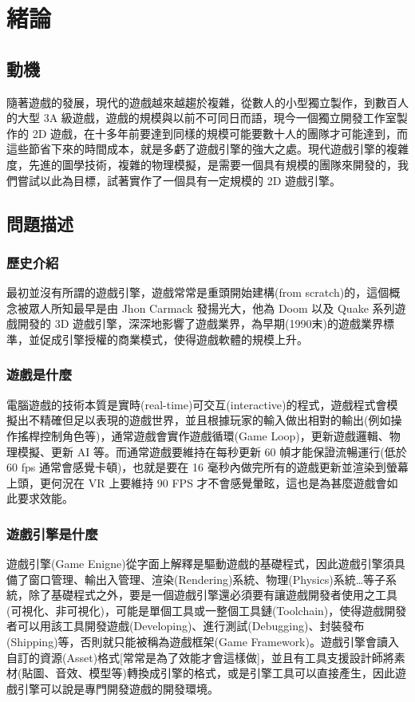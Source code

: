 \chapter{緒論}

\section{動機}

隨著遊戲的發展，現代的遊戲越來越趨於複雜，從數人的小型獨立製作，到數百人的大型 3A 級遊戲，遊戲的規模與以前不可同日而語，現今一個獨立開發工作室製作的 2D 遊戲，在十多年前要達到同樣的規模可能要數十人的團隊才可能達到，而這些節省下來的時間成本，就是多虧了遊戲引擎的強大之處。現代遊戲引擎的複雜度，先進的圖學技術，複雜的物理模擬，是需要一個具有規模的團隊來開發的，我們嘗試以此為目標，試著實作了一個具有一定規模的 2D 遊戲引擎。

\section{問題描述}

\subsection{歷史介紹}

最初並沒有所謂的遊戲引擎，遊戲常常是重頭開始建構(from scratch)的，這個概念被眾人所知最早是由 Jhon Carmack 發揚光大，他為 Doom 以及 Quake 系列遊戲開發的 3D 遊戲引擎，深深地影響了遊戲業界，為早期(1990末)的遊戲業界標準，並促成引擎授權的商業模式，使得遊戲軟體的規模上升。

\subsection{遊戲是什麼}
電腦遊戲的技術本質是實時(real-time)可交互(interactive)的程式，遊戲程式會模擬出不精確但足以表現的遊戲世界，並且根據玩家的輸入做出相對的輸出(例如操作搖桿控制角色等)，通常遊戲會實作遊戲循環(Game Loop)，更新遊戲邏輯、物理模擬、更新 AI 等。而通常遊戲要維持在每秒更新 60 幀才能保證流暢運行(低於 60 fps 通常會感覺卡頓)，也就是要在 16 毫秒內做完所有的遊戲更新並渲染到螢幕上頭，更何況在 VR 上要維持 90 FPS 才不會感覺暈眩，這也是為甚麼遊戲會如此要求效能。

\subsection{遊戲引擎是什麼}

遊戲引擎(Game Enigne)從字面上解釋是驅動遊戲的基礎程式，因此遊戲引擎須具備了窗口管理、輸出入管理、渲染(Rendering)系統、物理(Physics)系統…等子系統，除了基礎程式之外，要是一個遊戲引擎還必須要有讓遊戲開發者使用之工具(可視化、非可視化)，可能是單個工具或一整個工具鏈(Toolchain)，使得遊戲開發者可以用該工具開發遊戲(Developing)、進行測試(Debugging)、封裝發布(Shipping)等，否則就只能被稱為遊戲框架(Game Framework)。遊戲引擎會讀入自訂的資源(Asset)格式[常常是為了效能才會這樣做]，並且有工具支援設計師將素材(貼圖、音效、模型等)轉換成引擎的格式，或是引擎工具可以直接產生，因此遊戲引擎可以說是專門開發遊戲的開發環境。

